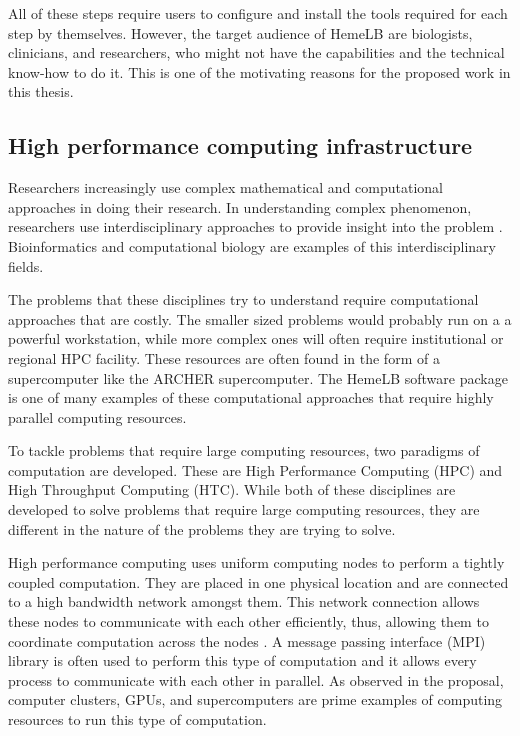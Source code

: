 All of these steps require users to configure and install the tools required for each step by themselves. However, the target audience of HemeLB are biologists, clinicians, and researchers, who might not have the capabilities and the technical know-how to do it. This is one of the motivating reasons for the proposed work in this thesis.


\subsection{High performance computing infrastructure}

Researchers increasingly use complex mathematical and computational approaches in doing their research. In understanding complex phenomenon, researchers use interdisciplinary approaches to provide insight into the problem \citep{huerta2000nih}. Bioinformatics and computational biology are examples of this interdisciplinary fields. 

The problems that these disciplines try to understand require computational approaches that are costly. The smaller sized problems would probably run on a a powerful workstation, while more complex ones will often require institutional or regional HPC facility. These resources are often found in the form of a supercomputer like the ARCHER supercomputer. The HemeLB software package is one of many examples of these computational approaches that require highly parallel computing resources.
 

%

To tackle problems that require large computing resources, two paradigms of computation are developed. These are High Performance Computing (HPC) and High Throughput Computing (HTC).   While both of these disciplines are developed to solve problems that require large computing resources, they are different in the nature of the problems they are trying to solve.

High performance computing uses  uniform  computing nodes to perform a  tightly coupled computation. They are placed in one physical location and are connected to a high bandwidth network amongst them. This network connection allows these nodes to communicate with each other efficiently, thus, allowing them to coordinate computation across the nodes \citep{Micro31:online}. A message passing interface (MPI) library is often used to perform this type of computation and it allows every process to communicate with each other in parallel. As observed in the proposal, computer clusters, GPUs, and supercomputers are prime examples of computing resources to run this type of computation.

